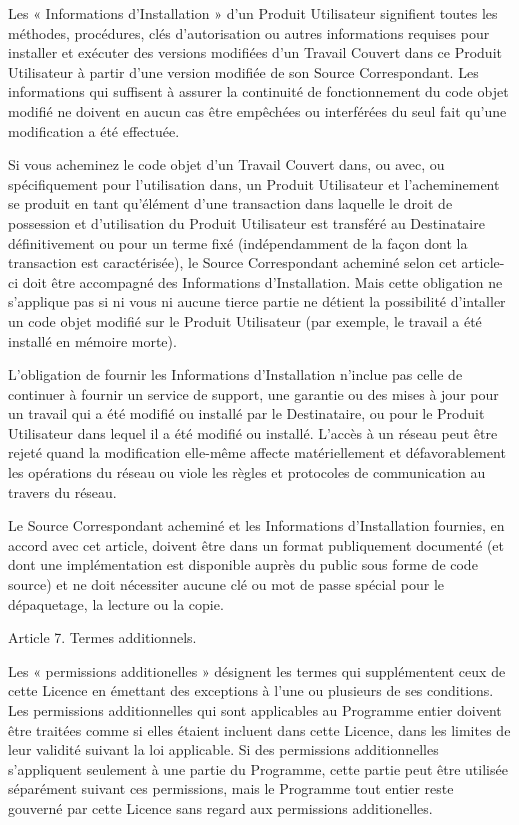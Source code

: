 {Les « Informations d’Installation » d’un Produit Utilisateur signifient
toutes les méthodes, procédures, clés d’autorisation ou autres
informations requises pour installer et exécuter des versions modifiées
d’un Travail Couvert dans ce Produit Utilisateur à partir d’une version
modifiée de son Source Correspondant. Les informations qui suffisent à
assurer la continuité de fonctionnement du code objet modifié ne
doivent en aucun cas être empêchées ou interférées du seul fait qu’une
modification a été effectuée.

Si vous acheminez le code objet d’un Travail Couvert dans, ou avec, ou
spécifiquement pour l’utilisation dans, un Produit Utilisateur et
l’acheminement se produit en tant qu’élément d’une transaction dans
laquelle le droit de possession et d’utilisation du Produit
Utilisateur est transféré au Destinataire définitivement ou pour un
terme fixé (indépendamment de la façon dont la transaction est
caractérisée), le Source Correspondant acheminé selon cet article-ci
doit être accompagné des Informations d’Installation. Mais cette
obligation ne s’applique pas si ni vous ni aucune tierce partie ne
détient la possibilité d’intaller un code objet modifié sur le Produit
Utilisateur (par exemple, le travail a été installé en mémoire morte).

L’obligation de fournir les Informations d’Installation n’inclue pas
celle de continuer à fournir un service de support, une garantie ou des
mises à jour pour un travail qui a été modifié ou installé par le
Destinataire, ou pour le Produit Utilisateur dans lequel il a été
modifié ou installé. L’accès à un réseau peut être rejeté quand la
modification elle-même affecte matériellement et défavorablement les
opérations du réseau ou viole les règles et protocoles de communication
au travers du réseau.

Le Source Correspondant acheminé et les Informations d’Installation
fournies, en accord avec cet article, doivent être dans un format
publiquement documenté (et dont une implémentation est disponible
auprès du public sous forme de code source) et ne doit nécessiter
aucune clé ou mot de passe spécial pour le dépaquetage, la lecture ou
la copie.


Article 7. Termes additionnels.

Les « permissions additionelles » désignent les termes qui
supplémentent ceux de cette Licence en émettant des exceptions à l’une
ou plusieurs de ses conditions. Les permissions additionnelles qui
sont applicables au Programme entier doivent être traitées comme si
elles étaient incluent dans cette Licence, dans les limites de leur
validité suivant la loi applicable. Si des permissions additionnelles
s’appliquent seulement à une partie du Programme, cette partie peut
être utilisée séparément suivant ces permissions, mais le Programme
tout entier reste gouverné par cette Licence sans regard aux
permissions additionelles.

}
